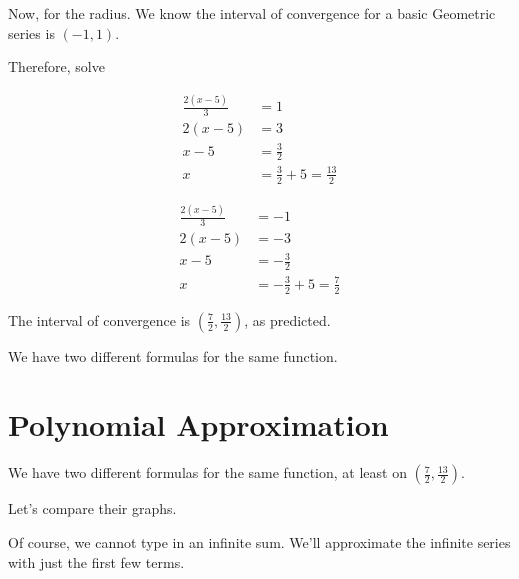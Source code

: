 \documentclass{ximera}
\begin{document}
\begin{example}
\begin{explanation}
Now, for the radius.  We know the interval of convergence for a basic Geometric series is $(-1, 1)$.


Therefore, solve



\begin{align*}
\frac{2(x-5)}{3} & = 1   \\
2(x-5) & = 3    \\
x-5 & = \frac{3}{2}    \\
x & = \frac{3}{2}  + 5 = \frac{13}{2}
\end{align*}




\begin{align*}
\frac{2(x-5)}{3} & = -1   \\
2(x-5) & = -3    \\
x-5 & = -\frac{3}{2}    \\
x & = -\frac{3}{2}  + 5 = \frac{7}{2}
\end{align*}




The interval of convergence is $\left( \frac{7}{2}, \frac{13}{2}\right)$, as predicted.



\end{explanation}

\end{example}


We have two different formulas for the same function.






















\section*{Polynomial Approximation}


We have two different formulas for the same function, at least on $\left( \frac{7}{2}, \frac{13}{2}\right)$.


Let's compare their graphs.

Of course, we cannot type in an infinite sum.  We'll approximate the infinite series with just the first few terms.
\end{document}
